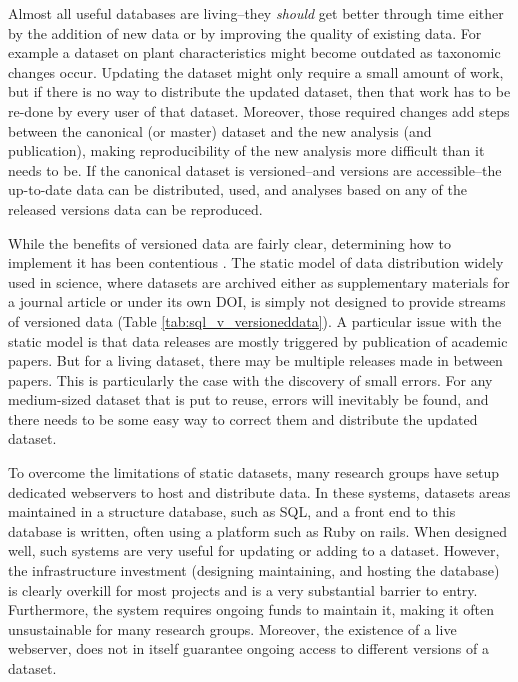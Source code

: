 \documentclass[a4paper,11pt]{article}
\begin{document}
Almost all useful databases are living--they \emph{should} get better
through time either by the addition of new data or by improving the
quality of existing data. For example a dataset on plant characteristics
might become outdated as taxonomic changes occur. Updating the dataset might only
require a small amount of work, but if there is no
way to distribute the updated dataset, then that work has to be re-done by
every user of that dataset. Moreover, those required changes add steps
between the canonical (or master) dataset and the new analysis (and publication),
making reproducibility of the new analysis more difficult than it needs
to be. If the canonical dataset is versioned--and versions are
accessible--the up-to-date data can be distributed, used, and analyses
based on any of the released versions data can be reproduced.

While the benefits of versioned data are fairly clear, determining how to implement it has been contentious . The static model of data distribution widely used in science, where datasets are archived either as supplementary materials for a journal article
or under its own DOI, is simply not designed to provide streams of versioned
data (Table \ref{tab:sql_v_versioneddata}). A particular issue with the static
model is that data releases are mostly triggered by publication of academic
papers. But for a living dataset, there may be multiple releases made in
between papers. This is particularly the case with the discovery of small
errors. For any medium-sized dataset that is put to reuse, errors will
inevitably be found, and there needs to be some easy  way to correct them and
distribute the updated dataset.

To overcome the limitations of static datasets, many research groups have
setup dedicated webservers to host and distribute data. In these systems,
datasets areas maintained in a structure database, such as SQL, and a front
end to this database is written, often using a platform such as Ruby on rails.
When designed well, such systems are very useful for updating or adding to a
dataset. However, the infrastructure investment (designing maintaining, and
hosting the database) is clearly overkill for most projects and is a very
substantial barrier to entry. Furthermore, the system requires ongoing funds to maintain it, making it often unsustainable for many research groups. Moreover, the existence of a live webserver,
does not in itself guarantee ongoing access to different versions of a
dataset.
\end{document}
